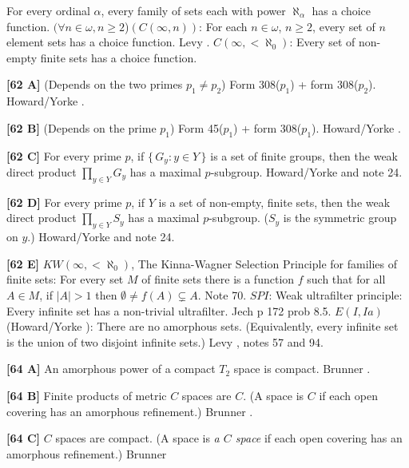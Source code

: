 For every ordinal $\alpha$, every family of sets each with power
$\aleph_{\alpha }$ has a choice function.
\medskip
{} $(\forall n\in\omega, n\ge 2$)$(C(\infty,n))$:
For each $n\in\omega$, $n\ge 2$, every set of $n$ element  sets
has a choice function.  \ac{Levy} \cite{1962}.
\medskip
{}  $C(\infty,< \aleph_{0})$:  Every set of non-empty
finite  sets  has  a choice function.
\smallskip
\item{}{\bf [62 A]} (Depends on the two primes $p_1\ne p_2$) Form 308($p_1$)
+ form 308($p_2$).  \ac{Howard/Yorke} \cite{1987}.
\smallskip
\item{}{\bf [62 B]} (Depends on the prime $p_1$)  Form 45($p_1$) + form
308($p_1$).  \ac{Howard/Yorke} \cite{1987}.
\smallskip
\item{}{\bf [62 C]}  For every prime $p$, if $\{\,G_y : y\in Y\,\}$
is a set of finite groups, then the weak direct product $\prod_{y\in Y}
G_y$ has a maximal $p$-subgroup. \ac{Howard/Yorke} \cite{1987} and note 24.
\smallskip
\item{}{\bf [62 D]} For every prime $p$, if $Y$ is a set of non-empty,
finite sets, then the weak direct product $\prod_{y\in Y} S_y$ has a
maximal $p$-subgroup. ($S_y$ is the symmetric group on $y$.)
\ac{Howard/Yorke} \cite{1987} and note 24.
\smallskip
\item{}{\bf [62 E]} $KW(\infty,<\aleph_0)$, The Kinna-Wagner Selection
Principle for families of finite sets: For every  set $M$ of finite
sets there is a function $f$ such that for all $A \in M$, if $|A| > 1$
then $\emptyset\neq f(A)\subsetneq A$. Note 70.
\medskip
{} $SPI$: Weak ultrafilter principle: Every infinite
set has a non-trivial ultrafilter. \ac{Jech} \cite{1973b} p 172 prob 8.5.
\medskip
{} $E(I,Ia)$ (\ac{Howard/Yorke} \cite{1989}): There
are no amorphous sets. (Equivalently, every infinite set is the union
of two disjoint infinite sets.) \ac{Levy} \cite{1958}, notes 57 and 94.
\smallskip
\item{}{\bf [64 A]}  An amorphous power of a compact $T_2$ space is
compact.  \ac{Brunner} \cite{1984b}.
\smallskip
\item{}{\bf [64 B]}  Finite products of metric $C$ spaces are $C$. (A
space is $C$ if each open covering has an amorphous refinement.)
\ac{Brunner} \cite{1984b}.
\smallskip
\item{}{\bf [64 C]} $C$ spaces are compact. (A space is {\it a $C$ space}
if each open covering has an amorphous refinement.)  \ac{Brunner}
